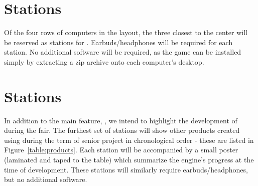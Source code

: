 \documentclass{GlobalDocument}
\begin{document}
\section{\ourgame{} Stations}
Of the four rows of computers in the layout, the three closest to the center will be reserved as stations for \ourgame{}. Earbuds/headphones will be required for each station. No additional software will be required, as the game can be installed simply by extracting a zip archive onto each computer's desktop.

\section{\ourengine{} Stations}
In addition to the main feature, \ourgame{}, we intend to highlight the development of \ourengine{} during the fair. The furthest set of stations will show other products created using \ourengine{} during the term of senior project in chronological order - these are listed in Figure~\ref{table:products}. Each station will be accompanied by a small poster (laminated and taped to the table) which summarize the engine's progress at the time of development. These stations will similarly require earbuds/headphones, but no additional software.
\end{document}
